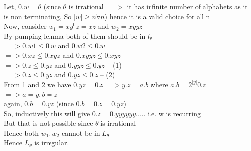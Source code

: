 \documentclass{article}
\begin{document}
\begin{enumerate}
        Let, $0.w = \theta$ (since $\theta$ is irrational $=>$ it has infinite number of alphabets as it is non terminating, So
        $|w| \geq n \forall n$) hence it is a valid choice for all n\\
        Now, consider $w_1 = xy^0z = xz$ and $w_2 = xyyz$\\
        By pumping lemma both of them should be in $l_\theta$\\
        $=> 0.w1 \leq 0.w $ and $0.w2 \leq 0.w $\\
        $=> 0.xz \leq 0.xyz$ and $0.xyyz \leq 0.xyz$\\
        $=> 0.z \leq 0.yz$ and $0.yyz \leq 0.yz$ -- (1)\\
        $=> 0.z \leq 0.yz$ and $0.yz \leq 0.z$ -- (2)\\
        From 1 and 2 we have $0.yz = 0.z => y.z = a.b $ where $a.b = 2^{|y|}0.z$\\
        $=> a = y, b = z$\\ 
        again, $0.b = 0.yz$ (since $0.b = 0.z = 0.yz$)\\
        So, inductively this will give $0.z = 0.yyyyyy.....$ i.e. w is recurring\\
        But that is not possible since $\theta $ is irrational\\
        Hence both $w_1,w_2$ cannot be in $L_\theta$\\
        Hence $L_\theta$ is irregular.\\


\end{enumerate}


\pagebreak
\end{document}
